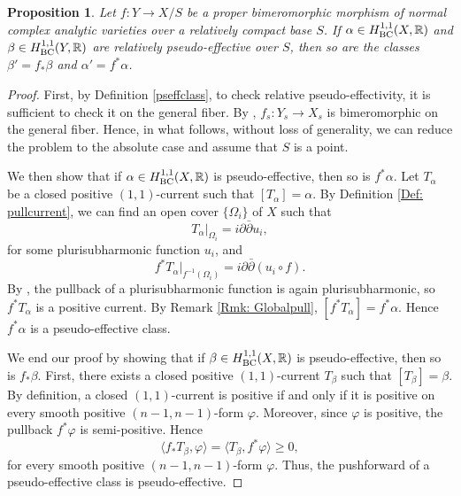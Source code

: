 \documentclass[12pt]{amsart}
\numberwithin{equation}{section}
\newtheorem{proposition}[theorem]{Proposition}
\theoremstyle{definition}
\theoremstyle{plain}
\newtheorem*{thm A*}{Theorem A}
\newtheorem*{thm B*}{Theorem B}
\newtheorem*{thm C*}{Theorem C}
\newtheorem*{thm D*}{Theorem D}
\theoremstyle{definition}
\renewcommand{\1}{\mathds{1}}
\renewcommand{\>}{\rightarrow}
\begin{document}
\begin{proposition}\label{Prop: PullPSEf}
Let $f: Y \rightarrow X/S$ be a proper bimeromorphic morphism of normal complex analytic varieties over a relatively compact base $S$. If $\alpha \in H^{1,1}_{\rm BC}(X,\mathbb{R})$ and ${{\beta}} \in H^{1,1}_{\rm BC}(Y,\mathbb{R})$ are relatively pseudo-effective over $S$, then so are the classes ${{\beta}}' = f_*{{\beta}}$ and $\alpha' = f^*\alpha$.
\end{proposition}
\begin{proof}
First, by Definition \ref{pseffclass}, to check relative pseudo-effectivity, it is sufficient to check it on the general fiber. By \cite[Corollary 3.2]{CRC25}, $f_s : Y_s \to X_s$ is bimeromorphic on the general fiber. Hence, in what follows, without loss of generality, we can reduce the problem to the absolute case and assume that $S$ is a point. 

We then show that if $\alpha \in H^{1,1}_{\rm BC}(X, \mathbb{R})$ is pseudo-effective, then so is $f^*\alpha$. Let $T_\alpha$ be a closed positive $(1,1)$-current such that $[T_\alpha] = \alpha$. By Definition \ref{Def: pullcurrent}, we can find an open cover $\{\Omega_i\}$ of $X$ such that
\[
T_\alpha|_{\Omega_i} = i \partial \bar{\partial} u_i,
\]
for some plurisubharmonic function $u_i$, and
\[
f^*T_\alpha \big|_{f^{-1}(\Omega_i)} = i \partial \bar{\partial} (u_i \circ f).
\]
By \cite[Proposition~1.1.8]{Demailly12}, the pullback of a plurisubharmonic function is again plurisubharmonic, so $f^*T_\alpha$ is a positive current. By Remark \ref{Rmk: Globalpull}, $[f^* T_{\alpha}] = f^* \alpha$. Hence $f^* \alpha$ is a pseudo-effective class.


We end our proof by showing that if $\beta \in H^{1,1}_{\rm BC}(X,\mathbb{R})$ is pseudo-effective, then so is $f_* \beta$. First, there exists a closed positive $(1,1)$-current $T_{\beta}$ such that $[T_{\beta}] = \beta$. By definition, a closed $(1,1)$-current is positive if and only if it is positive on every smooth positive $(n-1,n-1)$-form $\varphi$. Moreover, since $\varphi$ is positive, the pullback $f^*\varphi$ is semi-positive. Hence
\[
\langle f_* T_{\beta}, \varphi \rangle = \langle T_{\beta}, f^*\varphi \rangle \ge 0,
\]
for every smooth positive $(n-1,n-1)$-form $\varphi$. Thus, the pushforward of a pseudo-effective class is pseudo-effective.   
\end{proof}
\end{document}
